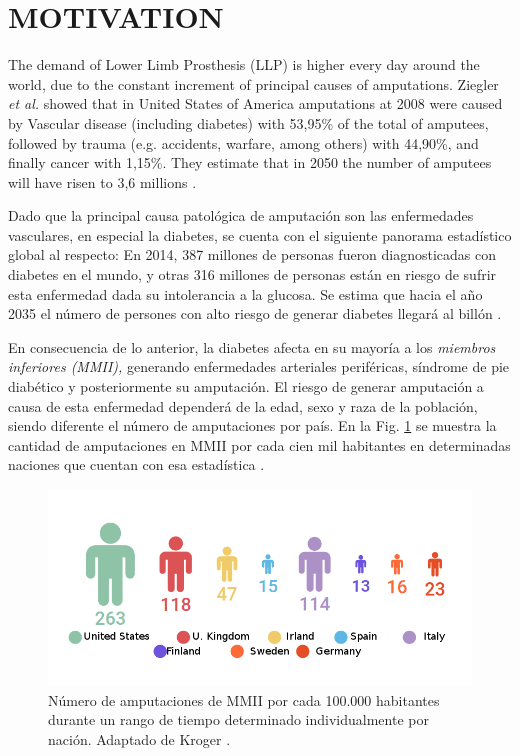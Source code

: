\documentclass[12pt,english]{article}
\begin{document}
\section*{MOTIVATION}

The demand of Lower Limb Prosthesis (LLP) is higher every day around the world, due to the constant increment of principal causes of amputations. Ziegler \emph{et al.}\cite{Ziegler-Graham2008} showed that in United States of America amputations at 2008 were caused by Vascular disease (including diabetes) with 53,95\% of the total of amputees, followed by trauma (e.g. accidents, warfare, among others) with 44,90\%, and finally cancer with 1,15\%. They estimate that in 2050 the number of amputees will have risen to 3,6 millions \cite{Ziegler-Graham2008}. 

Dado que la principal causa patológica de amputación son las enfermedades
vasculares, en especial la diabetes, se cuenta con el siguiente panorama estadístico global al respecto: En 2014, 387 millones de personas fueron
diagnosticadas con diabetes en el mundo, y otras 316 millones de personas
están en riesgo de sufrir esta enfermedad dada su intolerancia a la
glucosa. Se estima que hacia el año 2035 el número de persones con
alto riesgo de generar diabetes llegará al billón \cite{IDF2014}. 

En consecuencia de lo anterior, la diabetes afecta en su mayoría a
los \emph{miembros inferiores (MMII),
}generando enfermedades arteriales periféricas, síndrome de pie diabético
y posteriormente su amputación. El riesgo de generar amputación a
causa de esta enfermedad dependerá de la edad, sexo y raza de la población,
siendo diferente el número de amputaciones por país. En la Fig. \ref{fig:N=0000FAmero-de-amputaciones}
se muestra la cantidad de amputaciones en MMII por cada cien mil habitantes
en determinadas naciones que cuentan con esa estadística \cite{KrogerKnut2015}.

\begin{figure}[H]
\begin{centering}
\includegraphics[scale=0.5]{ampperyear}
\par\end{centering}

\caption{\label{fig:N=0000FAmero-de-amputaciones}Número de amputaciones de
MMII por cada 100.000 habitantes durante un rango de tiempo determinado
individualmente por nación. Adaptado de Kroger \cite{KrogerKnut2015}. }


\end{figure}
\end{document}
